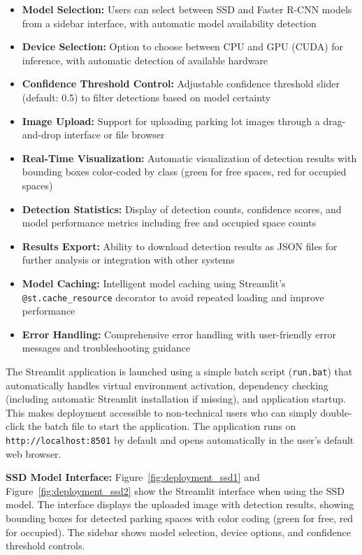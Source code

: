 \documentclass[12pt,a4paper]{article}
\begin{document}
\begin{itemize}
    \item \textbf{Model Selection:} Users can select between SSD and Faster R-CNN models from a sidebar interface, with automatic model availability detection
    \item \textbf{Device Selection:} Option to choose between CPU and GPU (CUDA) for inference, with automatic detection of available hardware
    \item \textbf{Confidence Threshold Control:} Adjustable confidence threshold slider (default: 0.5) to filter detections based on model certainty
    \item \textbf{Image Upload:} Support for uploading parking lot images through a drag-and-drop interface or file browser
    \item \textbf{Real-Time Visualization:} Automatic visualization of detection results with bounding boxes color-coded by class (green for free spaces, red for occupied spaces)
    \item \textbf{Detection Statistics:} Display of detection counts, confidence scores, and model performance metrics including free and occupied space counts
    \item \textbf{Results Export:} Ability to download detection results as JSON files for further analysis or integration with other systems
    \item \textbf{Model Caching:} Intelligent model caching using Streamlit's \texttt{@st.cache\_resource} decorator to avoid repeated loading and improve performance
    \item \textbf{Error Handling:} Comprehensive error handling with user-friendly error messages and troubleshooting guidance
\end{itemize}

The Streamlit application is launched using a simple batch script (\texttt{run.bat}) that automatically handles virtual environment activation, dependency checking (including automatic Streamlit installation if missing), and application startup. This makes deployment accessible to non-technical users who can simply double-click the batch file to start the application. The application runs on \texttt{http://localhost:8501} by default and opens automatically in the user's default web browser.

\textbf{SSD Model Interface:}
Figure~\ref{fig:deployment_ssd1} and Figure~\ref{fig:deployment_ssd2} show the Streamlit interface when using the SSD model. The interface displays the uploaded image with detection results, showing bounding boxes for detected parking spaces with color coding (green for free, red for occupied). The sidebar shows model selection, device options, and confidence threshold controls.
\end{document}
